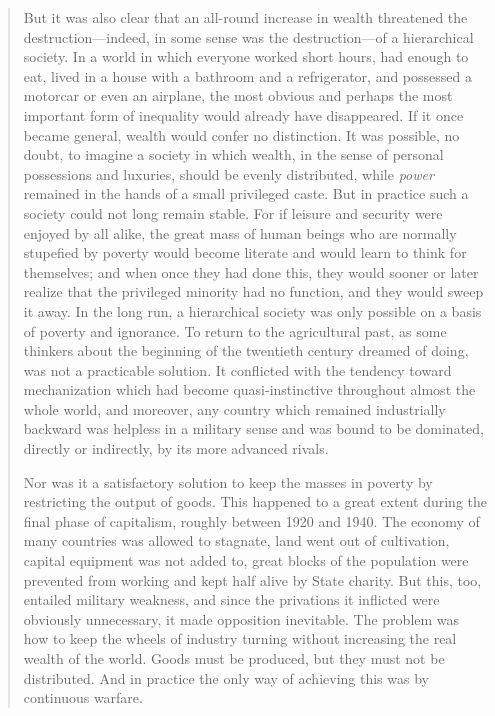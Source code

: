 \begin{quotation}
But it was also clear that an all-round increase in wealth threatened
the destruction---indeed, in some sense was the destruction---of a
hierarchical society. In a world in which everyone worked short hours,
had enough to eat, lived in a house with a bathroom and a refrigerator,
and possessed a motorcar or even an airplane, the most obvious and
perhaps the most important form of inequality would already have
disappeared. If it once became general, wealth would confer no
distinction. It was possible, no doubt, to imagine a society in which
wealth, in the sense of personal possessions and luxuries, should be
evenly distributed, while \emph{power} remained in the hands of a small
privileged caste. But in practice such a society could not long remain
stable. For if leisure and security were enjoyed by all alike, the great
mass of human beings who are normally stupefied by poverty would become
literate and would learn to think for themselves; and when once they had
done this, they would sooner or later realize that the privileged
minority had no function, and they would sweep it away. In the long run,
a hierarchical society was only possible on a basis of poverty and
ignorance. To return to the agricultural past, as some thinkers about
the beginning of the twentieth century dreamed of doing, was not a
practicable solution. It conflicted with the tendency toward
mechanization which had become quasi-instinctive throughout almost the
whole world, and moreover, any country which remained industrially
backward was helpless in a military sense and was bound to be dominated,
directly or indirectly, by its more advanced rivals.\par
Nor was it a satisfactory solution to keep the masses in poverty by
restricting the output of goods. This happened to a great extent during
the final phase of capitalism, roughly between 1920 and 1940. The
economy of many countries was allowed to stagnate, land went out of
cultivation, capital equipment was not added to, great blocks of the
population were prevented from working and kept half alive by State
charity. But this, too, entailed military weakness, and since the
privations it inflicted were obviously unnecessary, it made opposition
inevitable. The problem was how to keep the wheels of industry turning
without increasing the real wealth of the world. Goods must be produced,
but they must not be distributed. And in practice the only way of
achieving this was by continuous warfare.
\end{quotation}


